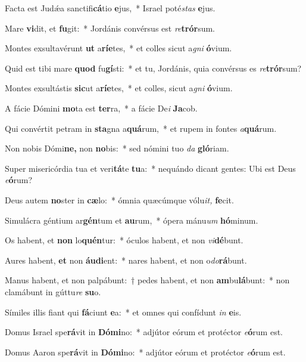 \item Facta est Judǽa sanctifi\textbf{cá}tio \textbf{e}jus,~* Israel poté\textit{stas} \textbf{e}jus.
\item Mare \textbf{vi}dit, et \textbf{fu}git:~* Jordánis convérsus est \textit{re}\textbf{trór}sum.
\item Montes exsultavérunt \textbf{ut} a\textbf{rí}\textbf{e}tes,~* et colles sicut a\textit{gni} \textbf{ó}vium.
\item Quid est tibi mare \textbf{quod} fu\textbf{gí}sti:~* et tu, Jordánis, quia convérsus es \textit{re}\textbf{trór}sum?
\item Montes exsultástis \textbf{sic}ut a\textbf{rí}\textbf{e}tes,~* et colles, sicut a\textit{gni} \textbf{ó}vium.
\item A fácie Dómini \textbf{mo}ta est \textbf{ter}ra,~* a fácie De\textit{i} \textbf{Ja}cob.
\item Qui convértit petram in \textbf{sta}gna a\textbf{quá}rum,~* et rupem in fontes \textit{a}\textbf{quá}rum.
\item Non nobis Dómi\textbf{ne,} non \textbf{no}bis:~* sed nómini tuo \textit{da} \textbf{gló}riam.
 \item Super misericórdia tua et veri\textbf{tá}te \textbf{tu}a:~* nequándo dicant gentes: Ubi est Deus \textit{e}\textbf{ó}rum?
\item Deus autem \textbf{no}ster in \textbf{cæ}lo:~* ómnia quæcúmque vólu\textit{it,} \textbf{fe}cit.
\item Simulácra géntium ar\textbf{gén}tum et \textbf{au}rum,~* ópera mánu\tinyhspace\textit{um} \textbf{hó}minum.
\item Os habent, et \textbf{non} lo\textbf{quén}tur:~* óculos habent, et non \textit{vi}\textbf{dé}bunt.
\item Aures habent, \textbf{et} non \textbf{áu}\textbf{di}ent:~* nares habent, et non o\textit{do}\textbf{rá}bunt.
\item Manus habent, et non palpábunt:~† pedes habent, et non \textbf{am}bu\textbf{lá}bunt:~* non clamábunt in gúttu\textit{re} \textbf{su}o.
\item Símiles illis fiant qui \textbf{fá}ciunt \textbf{e}a:~* et omnes qui confídunt \textit{in} \textbf{e}is.
\item Domus Israel spe\textbf{rá}vit in \textbf{Dó}\textbf{mi}no:~* adjútor eórum et protéctor \textit{e}\textbf{ó}rum est.
\item Domus Aaron spe\textbf{rá}vit in \textbf{Dó}\textbf{mi}no:~* adjútor eórum et protéctor \textit{e}\textbf{ó}rum est.
